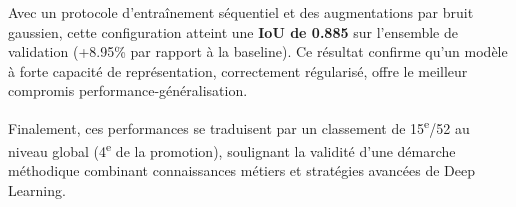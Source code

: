 Avec un protocole d'entraînement séquentiel et des augmentations par bruit gaussien, cette configuration atteint une \textbf{IoU de 0.885} sur l'ensemble de validation (+8.95\% par rapport à la baseline). Ce résultat confirme qu'un modèle à forte capacité de représentation, correctement régularisé, offre le meilleur compromis performance-généralisation.

Finalement, ces performances se traduisent par un classement de 15\textsuperscript{e}/52 au niveau global (4\textsuperscript{e} de la promotion), soulignant la validité d'une démarche méthodique combinant connaissances métiers et stratégies avancées de Deep Learning.